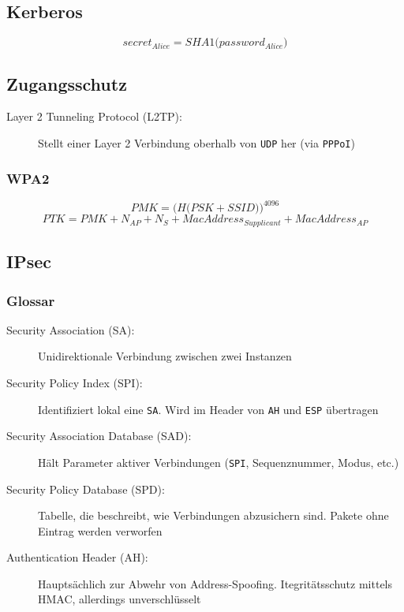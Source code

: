 \subsection{Kerberos}
\begin{equation}
	secret_{Alice} = SHA1\big(password_{Alice}\big)
\end{equation}

\subsection{Zugangsschutz}
\begin{description}
	\item[Layer 2 Tunneling Protocol (L2TP):] Stellt einer Layer 2 Verbindung oberhalb von \texttt{UDP} her (via \texttt{PPPoI})
\end{description}

\subsubsection{WPA2}
\begin{equation}
	PMK = \Big(H\big(PSK+SSID\big)\Big)^{4096}
\end{equation}
\begin{equation}
	PTK = PMK + N_{AP} + N_{S} + MacAddress_{Supplicant} + MacAddress_{AP}
\end{equation}


\subsection{IPsec}

\subsubsection{Glossar}
\begin{description}
	\item[Security Association (SA):] Unidirektionale Verbindung zwischen zwei Instanzen
	\item[Security Policy Index (SPI):] Identifiziert lokal eine \texttt{SA}. Wird im Header von \texttt{AH} und \texttt{ESP} übertragen
	\item[Security Association Database (SAD):] Hält Parameter aktiver Verbindungen (\texttt{SPI}, Sequenznummer, Modus, etc.)
	\item[Security Policy Database (SPD):] Tabelle, die beschreibt, wie Verbindungen abzusichern sind. Pakete ohne Eintrag werden verworfen
	\item[Authentication Header (AH):] Hauptsächlich zur Abwehr von Address-Spoofing. Itegritätsschutz mittels HMAC, allerdings unverschlüsselt
\end{description}


